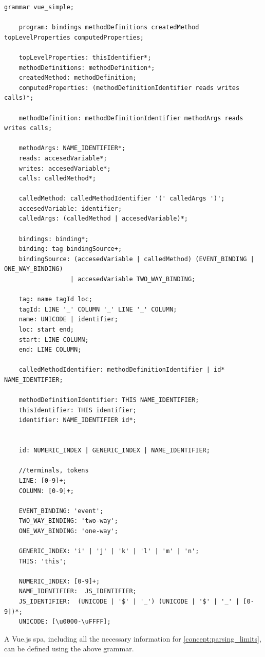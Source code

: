 \begin{lstlisting}[style=antrl]
    grammar vue_simple;

    program: bindings methodDefinitions createdMethod topLevelProperties computedProperties;
    
    topLevelProperties: thisIdentifier*;
    methodDefinitions: methodDefinition*; 
    createdMethod: methodDefinition;
    computedProperties: (methodDefinitionIdentifier reads writes calls)*;
    
    methodDefinition: methodDefinitionIdentifier methodArgs reads writes calls;
    
    methodArgs: NAME_IDENTIFIER*;
    reads: accesedVariable*;
    writes: accesedVariable*;
    calls: calledMethod*;
    
    calledMethod: calledMethodIdentifier '(' calledArgs ')';
    accesedVariable: identifier;
    calledArgs: (calledMethod | accesedVariable)*;
    
    bindings: binding*;
    binding: tag bindingSource+;
    bindingSource: (accesedVariable | calledMethod) (EVENT_BINDING | ONE_WAY_BINDING)
                  | accesedVariable TWO_WAY_BINDING;
    
    tag: name tagId loc;
    tagId: LINE '_' COLUMN '_' LINE '_' COLUMN;
    name: UNICODE | identifier;
    loc: start end;
    start: LINE COLUMN;
    end: LINE COLUMN;
    
    calledMethodIdentifier: methodDefinitionIdentifier | id* NAME_IDENTIFIER;
    
    methodDefinitionIdentifier: THIS NAME_IDENTIFIER;
    thisIdentifier: THIS identifier;
    identifier: NAME_IDENTIFIER id*;
    
    
    id: NUMERIC_INDEX | GENERIC_INDEX | NAME_IDENTIFIER;
    
    //terminals, tokens
    LINE: [0-9]+;
    COLUMN: [0-9]+;
    
    EVENT_BINDING: 'event';
    TWO_WAY_BINDING: 'two-way';
    ONE_WAY_BINDING: 'one-way';
    
    GENERIC_INDEX: 'i' | 'j' | 'k' | 'l' | 'm' | 'n';
    THIS: 'this';
    
    NUMERIC_INDEX: [0-9]+;
    NAME_IDENTIFIER:  JS_IDENTIFIER;
    JS_IDENTIFIER:  (UNICODE | '$' | '_') (UNICODE | '$' | '_' | [0-9])*;
    UNICODE: [\u0000-\uFFFF];
\end{lstlisting}
\label{ast}

A Vue.js \gls{spa}, including all the necessary information for \ref{concept:parsing_limits}, can be defined using the above grammar. 

